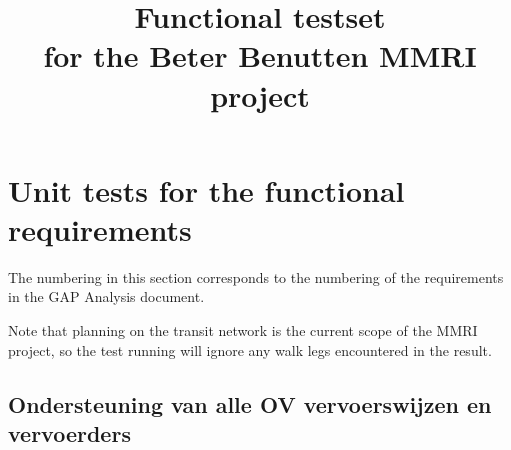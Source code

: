\documentclass[a4paper,11pt]{article}
\begin{document}
\title{Functional testset \\ \large for the Beter Benutten MMRI project}
\maketitle


\section{Unit tests for the functional requirements}

The numbering in this section corresponds to the numbering of the requirements in the GAP Analysis document.

Note that planning on the transit network is the current scope of the MMRI project, so the test running will ignore any walk legs encountered in the result.

\subsection{Ondersteuning van alle OV vervoerswijzen en vervoerders}
\end{document}

